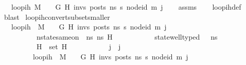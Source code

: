 \begin{isabellebody}
\ \ \ {\isachardoublequoteopen}loop{\isacharunderscore}{\kern0pt}ih\ M\ {\isasymLambda}\ {\isasymGamma}\ {\isasymOmega}\ G\ H\ invs\ posts\ ns{}\ s{\isacharprime}{\kern0pt}\ node{\isacharunderscore}{\kern0pt}id\ m{\isacharprime}{\kern0pt}\ j{\isachardoublequoteclose}\isanewline
%
\isadelimproof
\ \ %
\endisadelimproof
%
\isatagproof
{}\isamarkupfalse%
\ assms\isanewline
\ \ \isamarkupfalse%
\ loop{\isacharunderscore}{\kern0pt}ih{\isacharunderscore}{\kern0pt}def\isanewline
\ \ \isamarkupfalse%
\ blast%
\endisatagproof
{\isafoldproof}%
%
\isadelimproof
\isanewline
%
\endisadelimproof
\isanewline
{}\isamarkupfalse%
\ loop{\isacharunderscore}{\kern0pt}ih{\isacharunderscore}{\kern0pt}convert{\isacharunderscore}{\kern0pt}subset{\isacharunderscore}{\kern0pt}smaller{\isacharcolon}{\kern0pt}\isanewline
\ \ \ {\isachardoublequoteopen}loop{\isacharunderscore}{\kern0pt}ih\ \ M\ {\isasymLambda}\ {\isasymGamma}\ {\isasymOmega}\ G\ H\ invs\ posts\ ns{}\ s{\isacharprime}{\kern0pt}\ node{\isacharunderscore}{\kern0pt}id\ m{\isacharprime}{\kern0pt}\ j{\isachardoublequoteclose}\ \ \isanewline
\ \ \ \ \ \ \ \ \ \ {\isachardoublequoteopen}nstate{\isacharunderscore}{\kern0pt}same{\isacharunderscore}{\kern0pt}on\ {\isasymLambda}\ ns{}\ ns{}{\isacharprime}{\kern0pt}{\isacharprime}{\kern0pt}\ H{\isacharprime}{\kern0pt}{\isachardoublequoteclose}\ \isanewline
\ \ \ \ \ \ \ \ \ \ {\isachardoublequoteopen}state{\isacharunderscore}{\kern0pt}well{\isacharunderscore}{\kern0pt}typed\ {\isasymLambda}\ {\isasymOmega}\ ns{}{\isachardoublequoteclose}\ \isanewline
\ \ \ \ \ \ \ \ \ \ {\isachardoublequoteopen}H{\isacharprime}{\kern0pt}\ {\isasymsubseteq}\ {\isacharparenleft}{\kern0pt}set\ H{\isacharparenright}{\kern0pt}{\isachardoublequoteclose}\ \isanewline
\ \ \ \ \ \ \ \ \ \ {\isachardoublequoteopen}j{\isacharprime}{\kern0pt}\ {\isasymle}\ j{\isachardoublequoteclose}\isanewline
\ \ \ \ \ \ \ \ \ {\isachardoublequoteopen}loop{\isacharunderscore}{\kern0pt}ih\ \ M\ {\isasymLambda}\ {\isasymGamma}\ {\isasymOmega}\ G\ H\ invs\ posts\ ns{}{\isacharprime}{\kern0pt}{\isacharprime}{\kern0pt}\ s{\isacharprime}{\kern0pt}\ node{\isacharunderscore}{\kern0pt}id\ m{\isacharprime}{\kern0pt}\ j{\isacharprime}{\kern0pt}{\isachardoublequoteclose}\isanewline
%
\isadelimproof
\ \ %
\endisadelimproof
%
\isatagproof
{}\isamarkupfalse%

\end{isabellebody}
